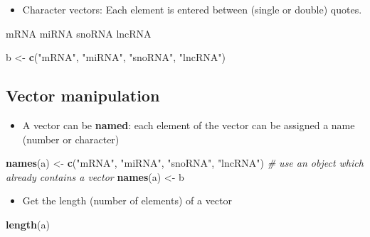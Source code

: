 \documentclass[]{book}
\newenvironment{Shaded}{\begin{snugshade}}{\end{snugshade}}
\newcommand{\CommentTok}[1]{\textcolor[rgb]{0.56,0.35,0.01}{\textit{#1}}}
\newcommand{\KeywordTok}[1]{\textcolor[rgb]{0.13,0.29,0.53}{\textbf{#1}}}
\newcommand{\NormalTok}[1]{#1}
\newcommand{\StringTok}[1]{\textcolor[rgb]{0.31,0.60,0.02}{#1}}
\providecommand{\tightlist}{%
  \setlength{\itemsep}{0pt}\setlength{\parskip}{0pt}}
\begin{document}
\begin{itemize}
\tightlist
\item
  Character vectors: Each element is entered between (single or double) quotes.
\end{itemize}

mRNA \textbar{} miRNA \textbar{} snoRNA \textbar{} lncRNA \textbar{}

\begin{Shaded}
\begin{Highlighting}[]
\NormalTok{b <-}\StringTok{ }\KeywordTok{c}\NormalTok{(}\StringTok{"mRNA"}\NormalTok{, }\StringTok{"miRNA"}\NormalTok{, }\StringTok{"snoRNA"}\NormalTok{, }\StringTok{"lncRNA"}\NormalTok{)}
\end{Highlighting}
\end{Shaded}

\hypertarget{vector-manipulation}{%
\subsection{Vector manipulation}\label{vector-manipulation}}

\begin{itemize}
\tightlist
\item
  A vector can be \textbf{named}: each element of the vector can be assigned a name (number or character)
\end{itemize}

\begin{Shaded}
\begin{Highlighting}[]
\KeywordTok{names}\NormalTok{(a) <-}\StringTok{ }\KeywordTok{c}\NormalTok{(}\StringTok{"mRNA"}\NormalTok{, }\StringTok{"miRNA"}\NormalTok{, }\StringTok{"snoRNA"}\NormalTok{, }\StringTok{"lncRNA"}\NormalTok{)}
\CommentTok{# use an object which already contains a vector}
\KeywordTok{names}\NormalTok{(a) <-}\StringTok{ }\NormalTok{b}
\end{Highlighting}
\end{Shaded}

\begin{itemize}
\tightlist
\item
  Get the length (number of elements) of a vector
\end{itemize}

\begin{Shaded}
\begin{Highlighting}[]
\KeywordTok{length}\NormalTok{(a)}
\end{Highlighting}
\end{Shaded}
\end{document}
